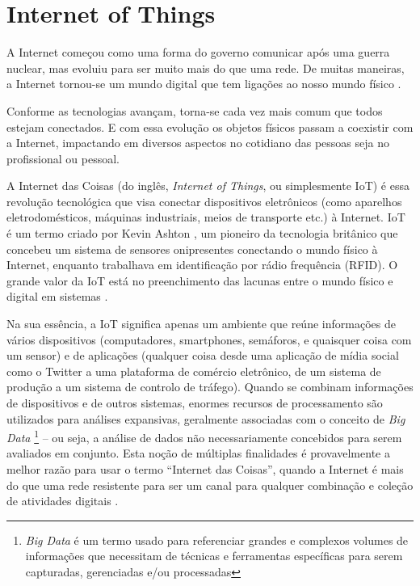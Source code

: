 \section{Internet of Things}
\label{sec:iot}

A Internet começou como uma forma do governo comunicar após uma guerra nuclear, mas evoluiu para ser muito mais do que uma rede. De muitas maneiras, a Internet tornou-se um mundo digital que tem ligações ao nosso mundo físico \cite{BrasilEscola}.

Conforme as tecnologias avançam, torna-se cada vez mais comum que todos estejam conectados. E com essa evolução os objetos físicos passam a coexistir com a Internet, impactando em diversos aspectos no cotidiano das pessoas seja no profissional ou pessoal.

A Internet das Coisas (do inglês, \textit{Internet of Things}, ou simplesmente IoT) é essa revolução tecnológica que visa conectar dispositivos eletrônicos (como aparelhos eletrodomésticos, máquinas industriais, meios de transporte etc.) à Internet. IoT é um termo criado por Kevin Ashton \cite{Kevin}, um pioneiro da tecnologia britânico que concebeu um sistema de sensores onipresentes conectando o mundo físico à Internet, enquanto trabalhava em identificação por rádio frequência (RFID). O grande valor da IoT está no preenchimento das lacunas entre o mundo físico e digital em sistemas \cite{Amazon}.

Na sua essência, a IoT significa apenas um ambiente que reúne informações de vários dispositivos (computadores, smartphones, semáforos, e quaisquer coisa com um sensor) e de aplicações (qualquer coisa desde uma aplicação de mídia social como o Twitter a uma plataforma de comércio eletrônico, de um sistema de produção a um sistema de controlo de tráfego). Quando se combinam informações de dispositivos e de outros sistemas, enormes recursos de processamento são utilizados para análises expansivas, geralmente associadas com o conceito de \textit{Big Data} \footnote{\textit{Big Data} é um termo usado para referenciar grandes e complexos volumes de informações que necessitam de técnicas e ferramentas específicas para serem capturadas, gerenciadas e/ou processadas} – ou seja, a análise de dados não necessariamente concebidos para serem avaliados em conjunto. Esta noção de múltiplas finalidades é provavelmente a melhor razão para usar o termo “Internet das Coisas”, quando a Internet é mais do que uma rede resistente para ser um canal para qualquer combinação e coleção de atividades digitais \cite{ComputerWorld}.

